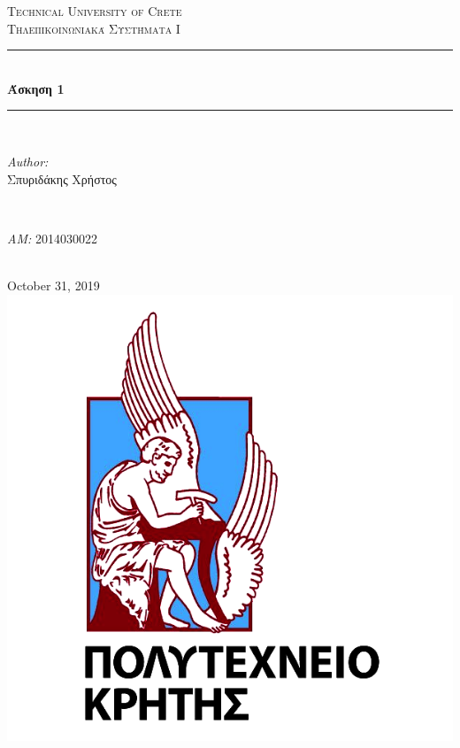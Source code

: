 \documentclass[11pt]{article}
\begin{document}
    \begin{titlepage}
        \center
        \textsc{\LARGE Technical University of Crete}\\[1,5cm] 
        \textsc{\Large Τηλεπικοινωνιακά Συστήματα Ι}\\[0.5cm] 
        
        \rule{\linewidth}{0.5mm} \\[0.5cm]
            { \huge \bfseries Άσκηση 1}\\[0.5cm]
        \rule{\linewidth}{0.5mm} \\[1.5cm]
        
        \begin{minipage}{0.4\textwidth}
            \begin{flushleft} \large
                \emph{Author:}\\
                    Σπυριδάκης Χρήστος
            \end{flushleft}
        \end{minipage}
        ~
        \begin{minipage}{0.4\textwidth}
            \begin{flushright} \large
                \emph{ΑΜ:} 2014030022
            \end{flushright}
        \end{minipage}\\[2cm]
        
        {\large October 31, 2019}\\[2cm] %
        \includegraphics[scale=0.5]{TUC.png} 
        \vfill
    \end{titlepage}
\end{document}
